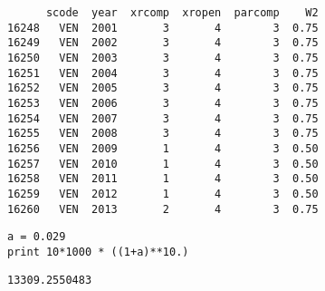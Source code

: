 \documentclass[12pt,fleqn]{article}\usepackage{common}
\begin{document}
\begin{verbatim}
      scode  year  xrcomp  xropen  parcomp    W2
16248   VEN  2001       3       4        3  0.75
16249   VEN  2002       3       4        3  0.75
16250   VEN  2003       3       4        3  0.75
16251   VEN  2004       3       4        3  0.75
16252   VEN  2005       3       4        3  0.75
16253   VEN  2006       3       4        3  0.75
16254   VEN  2007       3       4        3  0.75
16255   VEN  2008       3       4        3  0.75
16256   VEN  2009       1       4        3  0.50
16257   VEN  2010       1       4        3  0.50
16258   VEN  2011       1       4        3  0.50
16259   VEN  2012       1       4        3  0.50
16260   VEN  2013       2       4        3  0.75
\end{verbatim}

\begin{verbatim}
a = 0.029
print 10*1000 * ((1+a)**10.)
\end{verbatim}

\begin{verbatim}
13309.2550483
\end{verbatim}
\end{document}
